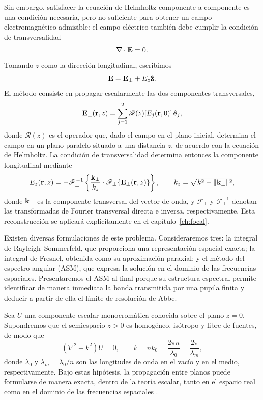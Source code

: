 Sin embargo, satisfacer la ecuación de Helmholtz componente a componente es
una condición necesaria, pero no suficiente para obtener un campo
electromagnético admisible: el campo eléctrico también debe cumplir la
condición de transversalidad
\begin{equation}
\nabla\cdot\vb E=0.
\label{eq:transversality_propagation}
\end{equation}
Tomando \(z\) como la dirección longitudinal, escribimos
\begin{equation}
\vb E
=
\vb E_\perp+E_z\bm{\hat{\mathbf{z}}}.
\end{equation}
El método consiste en propagar escalarmente las dos componentes
transversales,
\begin{equation}
\vb E_\perp(\vb r,z)
=
\sum_{j=1}^{2}
\mathscr R(z)\!\left[E_j(\vb r,0)\right]\bm{\hat{\mathbf{e}}}_j,
\end{equation}
donde \(\mathscr R(z)\) es el operador que, dado el campo en el plano inicial,
determina el campo en un plano paralelo situado a una distancia \(z\), de
acuerdo con la ecuación de Helmholtz. La condición de transversalidad
determina entonces la componente longitudinal mediante
\begin{equation}
E_z(\vb r,z)
=
-\mathscr F_\perp^{-1}
\left\{
\frac{\vb k_\perp}{k_z}\cdot
\mathscr F_\perp\!\left\{\vb E_\perp(\vb r,z)\right\}
\right\},
\qquad
k_z=\sqrt{k^2-\lVert\vb k_\perp\rVert^2},
\label{eq:Ez_from_transverse_spectrum}
\end{equation}
donde \(\vb k_\perp\) es la componente transversal del vector de onda, y
\(\mathscr F_\perp\) y \(\mathscr F_\perp^{-1}\) denotan las transformadas de
Fourier transversal directa e inversa, respectivamente. Esta reconstrucción se
aplicará explícitamente en el capítulo~\ref{ch:focal}.

Existen diversas formulaciones de este problema. Consideraremos tres:
la integral de Rayleigh--Sommerfeld, que proporciona una representación
espacial exacta; la integral de Fresnel, obtenida como su aproximación
paraxial; y el método del espectro angular (ASM), que expresa la solución en
el dominio de las frecuencias espaciales. Presentaremos el ASM al final porque
su estructura espectral permite identificar de manera inmediata la banda
transmitida por una pupila finita y deducir a partir de ella el límite de
resolución de Abbe.

Sea \(U\) una componente escalar monocromática conocida sobre el plano
\(z=0\). Supondremos que el semiespacio \(z>0\) es homogéneo, isótropo y libre
de fuentes, de modo que
\begin{equation}
\left(\nabla^2+k^2\right)U=0,
\qquad
k=nk_0=\frac{2\pi n}{\lambda_0}
=\frac{2\pi}{\lambda_m},
\end{equation}
donde \(\lambda_0\) y \(\lambda_m=\lambda_0/n\) son las longitudes de onda en
el vacío y en el medio, respectivamente. Bajo estas hipótesis, la propagación
entre planos puede formularse de manera exacta, dentro de la teoría escalar,
tanto en el espacio real como en el dominio de las frecuencias espaciales
\cite{goodman2005}.

